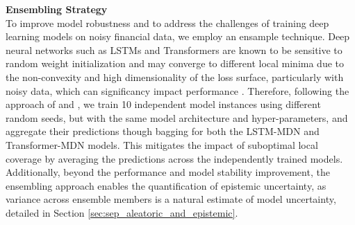 
\textbf{Ensembling Strategy} \\
To improve model robustness and to address the challenges of training deep learning models on noisy financial data, we employ an ensample technique. Deep neural networks such as LSTMs and Transformers are known to be sensitive to random weight initialization and may converge to different local minima due to the non-convexity and high dimensionality of the loss surface, particularly with noisy data, which can significancy impact performance \parencite{fatouros2022deepvar}. Therefore, following the approach of \textcite{fatouros2022deepvar} and \textcite{montavon2012ensamble}, we train 10 independent model instances using different random seeds, but with the same model architecture and hyper-parameters, and aggregate their predictions though bagging for both the LSTM-MDN and Transformer-MDN models. This mitigates the impact of suboptimal local coverage by averaging the predictions across the independently trained models. Additionally, beyond the performance and model stability improvement, the ensembling approach enables the quantification of epistemic uncertainty, as variance across ensemble members is a natural estimate of model uncertainty, detailed in Section \ref{sec:sep_aleatoric_and_epistemic}.



